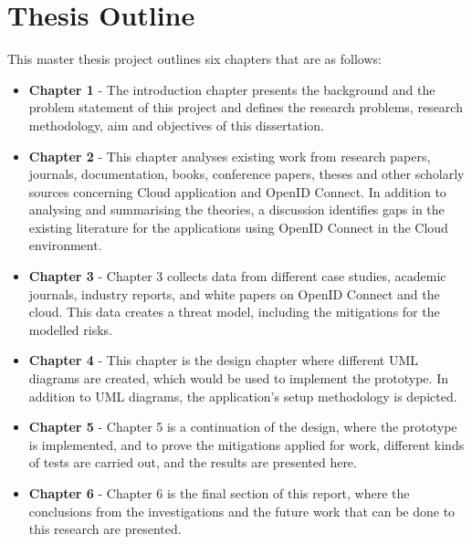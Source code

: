 \section{Thesis Outline}

This master thesis project outlines six chapters that are as follows:

\begin{itemize}
    \item \textbf{Chapter 1} - The introduction chapter presents the background and the problem statement of this project and defines the research problems, research methodology, aim and objectives of this dissertation.

    \item \textbf{Chapter 2} - This chapter analyses existing work from research papers, journals, documentation, books, conference papers, theses and other scholarly sources concerning Cloud application and OpenID Connect. In addition to analysing and summarising the theories, a discussion identifies gaps in the existing literature for the applications using OpenID Connect in the Cloud environment.

    \item \textbf{Chapter 3} - Chapter 3 collects data from different case studies, academic journals, industry reports, and white papers on OpenID Connect and the cloud. This data creates a threat model, including the mitigations for the modelled risks. 
    
    \item \textbf{Chapter 4} - This chapter is the design chapter where different UML diagrams are created, which would be used to implement the prototype. In addition to UML diagrams, the application's setup methodology is depicted.
    
    \item \textbf{Chapter 5} - Chapter 5 is a continuation of the design, where the prototype is implemented, and to prove the mitigations applied for work, different kinds of tests are carried out, and the results are presented here.
    
    \item \textbf{Chapter 6} - Chapter 6 is the final section of this report, where the conclusions from the investigations and the future work that can be done to this research are presented.

\end{itemize}
